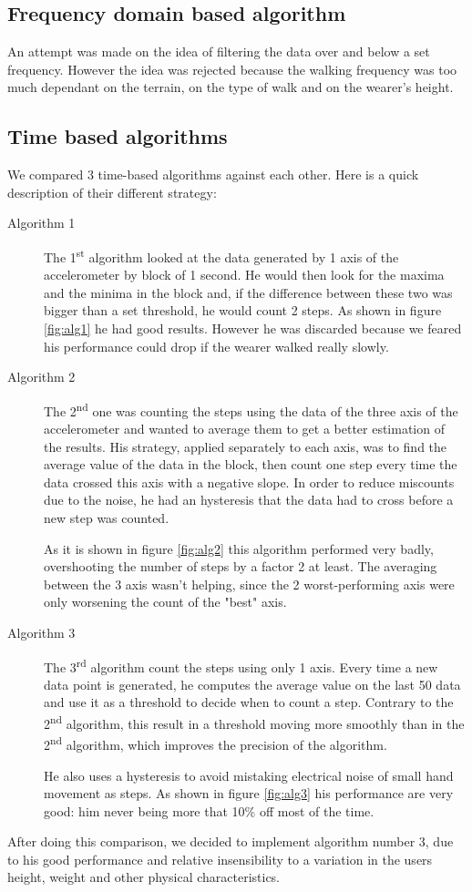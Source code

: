 \documentclass[12pt,twoside,a4paper]{article}
\newcommand{\ts}{\textsuperscript}
\begin{document}
\subsection{Frequency domain based algorithm}
An attempt was made on the idea of filtering the data over and below a set frequency. However the idea was rejected because the walking frequency was too much dependant on the terrain, on the type of walk and on the wearer's height.
\subsection{Time based algorithms}
We compared 3 time-based algorithms against each other. Here is a quick description of their different strategy:
\begin{description}
\item [Algorithm 1] The 1\ts{st} algorithm looked at the data generated by 1 axis of the accelerometer by block of 1 second. He would then look for the maxima and the minima in the block and, if the difference between these two was bigger than a set threshold, he would count 2 steps. As shown in figure \ref{fig:alg1} he had good results. However he was discarded because we feared his performance could drop if the wearer walked really slowly.
\item [Algorithm 2] The 2\ts{nd} one was counting the steps using the data of the three axis of the accelerometer and wanted to average them to get a better estimation of the results. His strategy, applied separately to each axis, was to find the average value of the data in the block, then count one step every time the data crossed this axis with a negative slope. In order to reduce miscounts due to the noise, he had an hysteresis that the data had to cross before a new step was counted.

As it is shown in figure \ref{fig:alg2} this algorithm performed very badly, overshooting the number of steps by a factor 2 at least. The averaging between the 3 axis wasn't helping, since the 2 worst-performing axis were only worsening the count of the "best" axis.
\item [Algorithm 3] The 3\ts{rd} algorithm count the steps using only 1 axis. Every time a new data point is generated, he computes the average value on the last 50 data and use it as a threshold to decide when to count a step. Contrary to the 2\ts{nd} algorithm, this result in a threshold moving more smoothly than in the 2\ts{nd} algorithm, which improves the precision of the algorithm.

He also uses a hysteresis to avoid mistaking electrical noise of small hand movement as steps. As shown in figure \ref{fig:alg3} his performance are very good: him never being more that 10\% off most of the time.
\end{description}

After doing this comparison, we decided to implement algorithm number 3, due to his good performance and relative insensibility to a variation in the users height, weight and other physical characteristics.
\end{document}
